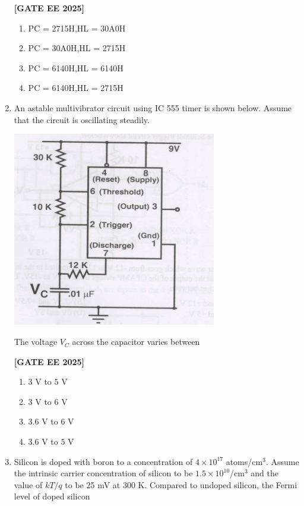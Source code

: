 \documentclass[12pt]{article}
\begin{document}
\begin{enumerate}[leftmargin=*, label=\textbf{Q.\arabic*:}]
\noindent \textbf{[GATE EE 2025]}
\begin{enumerate}[label=(\Alph*)]
  \item PC = 2715H,\quad HL = 30A0H
  \item PC = 30A0H,\quad HL = 2715H
  \item PC = 6140H,\quad HL = 6140H
  \item PC = 6140H,\quad HL = 2715H
\end{enumerate}

\item An astable multivibrator circuit using IC 555 timer is shown below. Assume that the circuit is oscillating steadily.

\begin{center}
\includegraphics[width=0.7\textwidth]{figs/q50.png}
\end{center}

The voltage $V_C$ across the capacitor varies between
 
\noindent \textbf{[GATE EE 2025]}
\begin{enumerate}[label=(\Alph*)]
    \item $3$ V to $5$ V
    \item $3$ V to $6$ V
    \item $3.6$ V to $6$ V
    \item $3.6$ V to $5$ V
\end{enumerate}

\item Silicon is doped with boron to a concentration of $4 \times 10^{17}$ atoms/cm$^3$. Assume the intrinsic carrier concentration of silicon to be $1.5\times10^{10}$/cm$^3$ and the value of $kT/q$ to be 25 mV at 300 K. Compared to undoped silicon, the Fermi level of doped silicon
 

\end{enumerate}
\end{document}
